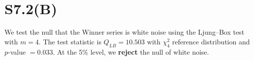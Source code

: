 \section*{S7.2(B)}
We test the null that the Winner series is white noise using the Ljung--Box test with $m=4$. 
The test statistic is $Q_{LB} = 10.503$ with $\chi^2_4$ reference distribution and 
$p$-value $= 0.033$. 
At the 5\% level, we 
\textbf{reject} the null of white noise.
